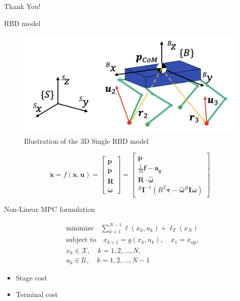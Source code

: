 \documentclass{beamer}
\begin{document}
\begin{frame}
	\LARGE{Thank You!}
\end{frame}\normalfont


\begin{frame}{RBD model}
\begin{figure}
    \centering
    \includegraphics[width=0.6\linewidth]{Illustration-RBD-model.png}
    \caption{Illustration of the 3D Single RBD model}
    \label{fig:rbd-model}
\end{figure}
\begin{equation*}
    \mathbf{\dot{x}} = f(\mathbf{x}, \mathbf{u}) = 
    \begin{bmatrix}
    \mathbf{\dot{p}} \\
    \mathbf{\ddot{p}} \\
    \mathbf{\dot{R}} \\
    \boldsymbol{\dot{\omega}}
    \end{bmatrix}
    =
    \begin{bmatrix}
    \mathbf{\dot{p}} \\
    \frac{1}{M} \mathbf{f} - \mathbf{a_g} \\
    \mathbf{R} \cdot \hat{\boldsymbol{\omega}} \\
    {}^{B} \mathbf{I}^{-1}(R^T \boldsymbol{\tau} - \hat{\boldsymbol{\omega}} {}^{B} \mathbf{I} \boldsymbol{\omega})
    \end{bmatrix}
\end{equation*}
\end{frame}


\begin{frame}{Non-Linear MPC formulation}

\begin{equation*}
\begin{aligned}
    & \text{minimize} \quad \sum_{k=1}^{N-1} \ell(x_k, u_k) + \ell_T(x_N) \\
    & \text{subject to} \quad x_{k+1} = g(x_k, u_k), \quad x_1 = x_\text{op}, \\
    & x_k \in \mathcal{X}, \quad k = 1, 2, \dots, N, \\
    & u_k \in \mathcal{U}, \quad k = 1, 2, \dots, N-1
\end{aligned}
\end{equation*}

\begin{itemize}
    \item Stage cost
    \item Terminal cost
\end{itemize}

\end{frame}
\end{document}
